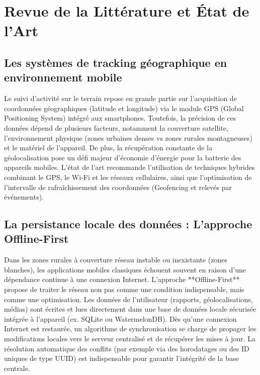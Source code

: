 \documentclass[12pt,a4paper]{report}
\begin{document}
\chapter{Revue de la Littérature et État de l'Art}

\section{Les systèmes de tracking géographique en environnement mobile}
Le suivi d'activité sur le terrain repose en grande partie sur l'acquisition de coordonnées géographiques (latitude et longitude) via le module GPS (Global Positioning System) intégré aux smartphones. Toutefois, la précision de ces données dépend de plusieurs facteurs, notamment la couverture satellite, l'environnement physique (zones urbaines denses vs zones rurales montagneuses) et le matériel de l'appareil.
De plus, la récupération constante de la géolocalisation pose un défi majeur d'économie d'énergie pour la batterie des appareils mobiles. L'état de l'art recommande l'utilisation de techniques hybrides combinant le GPS, le Wi-Fi et les réseaux cellulaires, ainsi que l'optimisation de l'intervalle de rafraîchissement des coordonnées (Geofencing et relevés par événements).

\section{La persistance locale des données : L'approche Offline-First}
Dans les zones rurales à couverture réseau instable ou inexistante (zones blanches), les applications mobiles classiques échouent souvent en raison d'une dépendance continue à une connexion Internet. L'approche **Offline-First** propose de traiter le réseau non pas comme une condition indispensable, mais comme une optimisation.
Les données de l'utilisateur (rapports, géolocalisations, médias) sont écrites et lues directement dans une base de données locale sécurisée intégrée à l'appareil (ex. SQLite ou WatermelonDB). Dès qu'une connexion Internet est restaurée, un algorithme de synchronisation se charge de propager les modifications locales vers le serveur centralisé et de récupérer les mises à jour. La résolution automatique des conflits (par exemple via des horodatages ou des ID uniques de type UUID) est indispensable pour garantir l'intégrité de la base centrale.
\end{document}
